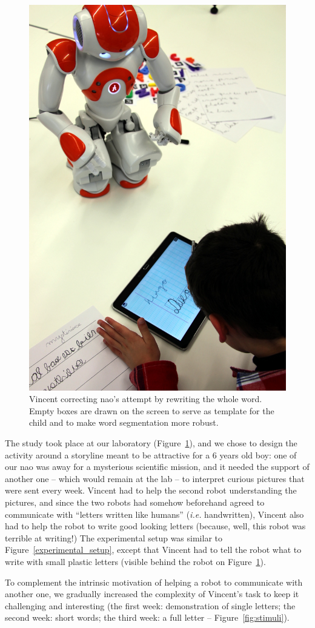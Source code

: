 \documentclass{article}
\newcommand{\ie}{\textit{i.e.}\xspace}
\begin{document}
\begin{figure}
    \centering
    \includegraphics[width=0.5\linewidth]{diego}
    \caption{\small Vincent correcting {\sc nao}'s attempt by rewriting the
        whole word. Empty boxes are drawn on the screen to serve as template for the child
        and to make word segmentation more robust.}
    \label{fig:diego}
\end{figure}

The study took place at our laboratory (Figure~\ref{fig:diego}), and we chose to
design the activity around a storyline meant to be attractive for a 6 years old
boy: one of our {\sc nao} was away for a mysterious scientific mission, and it
needed the support of another one -- which would remain at the lab -- to interpret
curious pictures that were sent every week. Vincent had to help the second robot
understanding the pictures, and since the two robots had somehow beforehand
agreed to communicate with ``letters written like humans'' (\ie handwritten),
Vincent also had to help the robot to write good looking letters (because, well,
this robot was terrible at writing!) The experimental setup was similar to
Figure~\ref{experimental_setup}, except that Vincent had to tell the robot what
to write with small plastic letters (visible behind the robot on Figure~\ref{fig:diego}).

To complement the intrinsic motivation of helping a robot to communicate with another one, we
gradually increased the complexity of Vincent's task to keep it challenging and
interesting (the first week: demonstration of single letters; the second week:
short words; the third week: a full letter -- Figure~\ref{fig:stimuli}).
\end{document}
